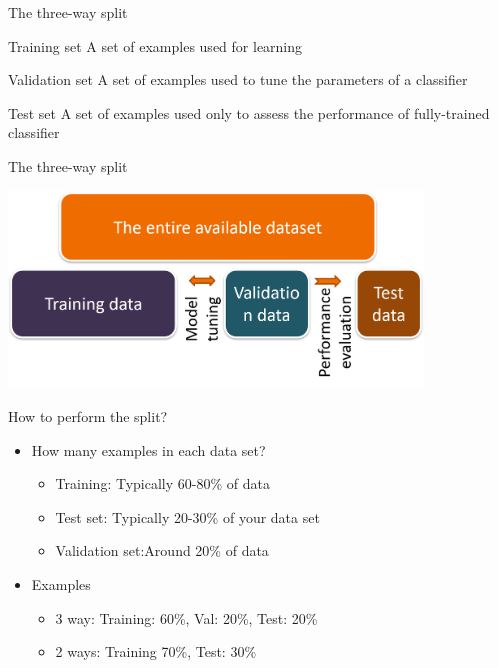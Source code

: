 \documentclass[aspectratio=169,14pt,usenames,dvipsnames]{beamer}
\begin{document}
\begin{frame}[t]{The three-way split}
\begin{block}{Training set}
A set of examples used for learning
\end{block}
\begin{block}{Validation set}
A set of examples used to tune the parameters of a classifier
\end{block}
\begin{block}{Test set }
A set of examples used only to assess the performance of fully-trained classifier
\end{block}
\end{frame}


\begin{frame}[t]{The three-way split}
\begin{center}
\includegraphics[width=11cm]{Images/AIML_MLPrinciples_IMG8.png}
\end{center}
\end{frame}


\begin{frame}[t]{How to perform the split?}
\begin{itemize}
\item How many examples in each data set? 
\begin{itemize}
\item \alert{Training:} Typically 60-80\% of data
\item \alert{Test set:} Typically 20-30\% of your data set
\item \alert{Validation set:}Around 20\% of data
\end{itemize}
\item Examples
\begin{itemize}
\item \alert{3 way:} Training: 60\%, Val: 20\%, Test: 20\%
\item \alert{2 ways:} Training 70\%, Test: 30\%
\end{itemize}
\end{itemize}
\end{frame}
\end{document}
